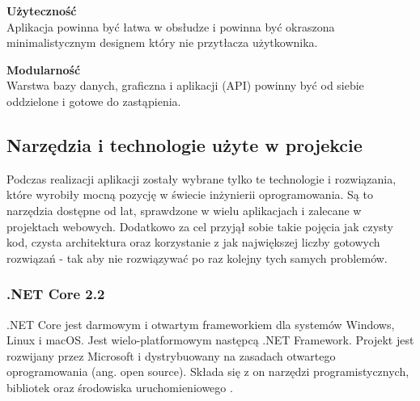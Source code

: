 \documentclass[12pt]{article}
\numberwithin{figure}{section}
\begin{document}
\begin{sloppypar}
\noindent
\textbf{Użyteczność }\\
\indent
Aplikacja powinna być łatwa w obsłudze i powinna być okraszona minimalistycznym designem który nie przytłacza użytkownika.

\noindent
\textbf{Modularność}\\
Warstwa bazy danych, graficzna i aplikacji (API) powinny być od siebie oddzielone i gotowe do zastąpienia.
    
\subsection{Narzędzia i technologie użyte w projekcie}
Podczas realizacji aplikacji zostały wybrane tylko te technologie i rozwiązania, które wyrobiły mocną pozycję w świecie inżynierii oprogramowania. Są to narzędzia dostępne od lat, sprawdzone w wielu aplikacjach i zalecane w projektach webowych. Dodatkowo za cel przyjął sobie takie pojęcia jak czysty kod, czysta architektura oraz korzystanie z jak największej liczby gotowych rozwiązań - tak aby nie rozwiązywać po raz kolejny tych samych problemów.

\subsubsection{.NET Core 2.2}
.NET Core jest darmowym i otwartym frameworkiem dla systemów Windows, Linux i macOS. Jest wielo-platformowym następcą .NET Framework. Projekt jest rozwijany przez Microsoft i dystrybuowany na zasadach otwartego oprogramowania (ang. open source). Składa się z on narzędzi programistycznych, bibliotek oraz środowiska uruchomieniowego \cite{dotnet-core}. 
    

\end{sloppypar}
\end{document}
